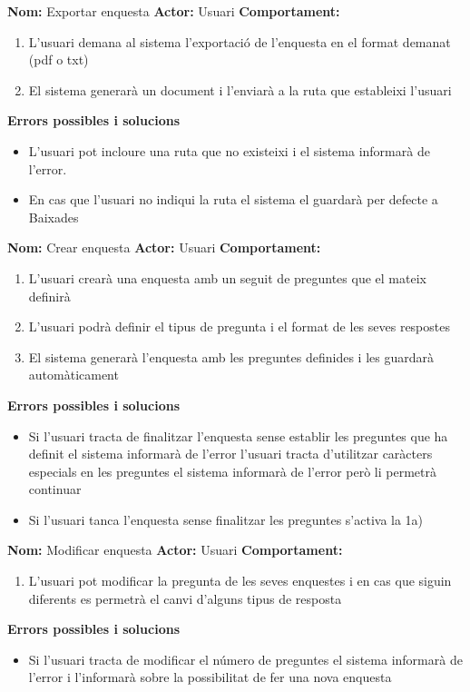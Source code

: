 \documentclass[../main.tex]{subfiles}
\begin{document}
\vspace{0.5 cm}

\textbf{Nom:} Exportar enquesta
\textbf{Actor:} Usuari
\textbf{Comportament:}
\begin{enumerate}
    \item L’usuari demana al sistema l’exportació de l’enquesta en el format demanat (pdf o txt)
    \item El sistema generarà un document i l’enviarà a la ruta que estableixi l’usuari
\end{enumerate}
\textbf{Errors possibles i solucions}
\begin{itemize}
    \item L’usuari pot incloure una ruta que no existeixi i el sistema informarà de l’error.
    \item En cas que l’usuari no indiqui la ruta el sistema el guardarà per defecte a Baixades
\end{itemize}

\vspace{0.5 cm}

\textbf{Nom:} Crear enquesta
\textbf{Actor:} Usuari
\textbf{Comportament:}
\begin{enumerate}
    \item L’usuari crearà una enquesta amb un seguit de preguntes que el mateix definirà
    \item L’usuari podrà definir el tipus de pregunta i el format de les seves respostes
    \item El sistema generarà l’enquesta amb les preguntes definides i les guardarà automàticament
\end{enumerate}
\textbf{Errors possibles i solucions}
\begin{itemize}
    \item Si l’usuari tracta de finalitzar l’enquesta sense establir les preguntes que ha definit el sistema informarà de l’error
    \itemSi l’usuari tracta d’utilitzar caràcters especials en les preguntes el sistema informarà de l’error però li permetrà continuar
    \item Si l’usuari tanca l’enquesta sense finalitzar les preguntes s’activa la 1a)
\end{itemize}

\vspace{0.5 cm}

\textbf{Nom:} Modificar enquesta
\textbf{Actor:} Usuari
\textbf{Comportament:}
\begin{enumerate}
    \item L’usuari pot modificar la pregunta de les seves enquestes i en cas que siguin diferents es permetrà el canvi d’alguns tipus de resposta
\end{enumerate}
\textbf{Errors possibles i solucions}
\begin{itemize}
    \item Si l’usuari tracta de modificar el número de preguntes el sistema informarà de l’error i l'informarà sobre la possibilitat de fer una nova enquesta
\end{itemize}
\end{document}
